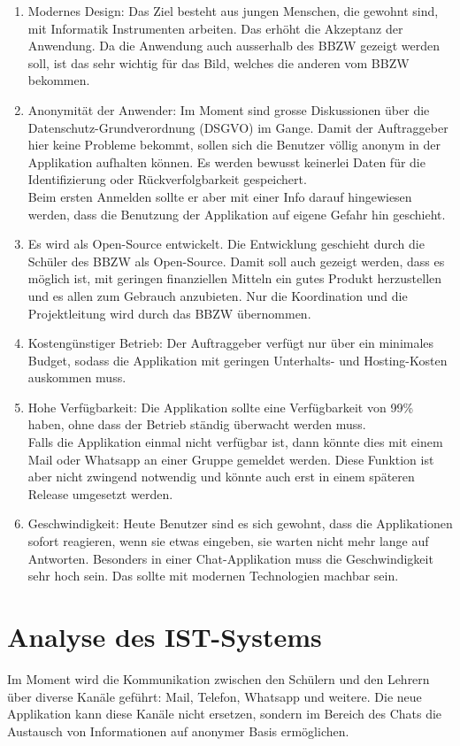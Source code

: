 \documentclass[12pt]{article}
\begin{document}
      \begin{enumerate}
        \item Modernes Design: Das Ziel besteht aus jungen Menschen, die gewohnt sind, mit Informatik Instrumenten arbeiten. Das erhöht die Akzeptanz der Anwendung. Da die Anwendung auch ausserhalb des BBZW gezeigt werden soll, ist das sehr wichtig für das Bild, welches die anderen vom BBZW bekommen.
        \item Anonymität der Anwender:  Im Moment sind grosse Diskussionen über die Datenschutz-Grundverordnung (DSGVO) im Gange. Damit der Auftraggeber hier keine Probleme bekommt, sollen sich die Benutzer völlig anonym in der Applikation aufhalten können. Es werden bewusst keinerlei Daten für die Identifizierung oder Rückverfolgbarkeit gespeichert. \\
            Beim ersten Anmelden sollte er aber mit einer Info darauf hingewiesen werden, dass die Benutzung der Applikation auf eigene Gefahr hin geschieht.
        \item Es wird als Open-Source entwickelt. Die Entwicklung geschieht durch die Schüler des BBZW als Open-Source. Damit soll auch gezeigt werden, dass es möglich ist, mit geringen finanziellen Mitteln ein gutes Produkt herzustellen und es allen zum Gebrauch anzubieten. Nur die Koordination und die Projektleitung wird durch das BBZW übernommen.
        \item Kostengünstiger Betrieb: Der Auftraggeber verfügt nur über ein minimales Budget, sodass die Applikation mit geringen Unterhalts- und Hosting-Kosten auskommen muss.
        \item Hohe Verfügbarkeit: Die Applikation sollte eine Verfügbarkeit von 99\% haben, ohne dass der Betrieb ständig überwacht werden muss. \\
            Falls die Applikation einmal nicht verfügbar ist, dann könnte dies mit einem Mail oder Whatsapp an einer Gruppe gemeldet werden. Diese Funktion ist aber nicht zwingend notwendig und könnte auch erst in einem späteren Release umgesetzt werden.
        \item Geschwindigkeit: Heute Benutzer sind es sich gewohnt, dass die Applikationen sofort reagieren, wenn sie etwas eingeben, sie warten nicht mehr lange auf Antworten. Besonders in einer Chat-Applikation muss die Geschwindigkeit sehr hoch sein. Das sollte mit modernen Technologien machbar sein.
      \end{enumerate}

  \section{Analyse des IST-Systems}
    Im Moment wird die Kommunikation zwischen den Schülern und den Lehrern über diverse Kanäle geführt: Mail, Telefon, Whatsapp und weitere. Die neue Applikation kann diese Kanäle nicht ersetzen, sondern im Bereich des Chats die Austausch von Informationen auf anonymer Basis ermöglichen.
\end{document}
